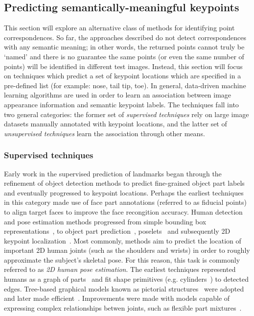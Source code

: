 \subsection{Predicting semantically-meaningful keypoints}

This section will explore an alternative class of methods for identifying point correspondences. So far, the approaches described do not detect correspondences with any semantic meaning; in other words, the returned points cannot truly be `named' and there is no guarantee the same points (or even the same number of points) will be identified in different test images. Instead, this section will focus on techniques which predict a set of keypoint locations which are specified in a pre-defined list (for example: nose, tail tip, toe). In general, data-driven machine learning algorithms are used in order to learn an association between image appearance information and semantic keypoint labels. The techniques fall into two general categories: the former set of \emph{supervised techniques} rely on large image datasets manually annotated with keypoint locations, and the latter set of \emph{unsupervised techniques} learn the association through other means. 

\subsubsection{Supervised techniques}

Early work in the supervised prediction of landmarks began through the refinement of object detection methods to predict fine-grained object part labels and eventually progressed to keypoint locations. Perhaps the earliest techniques in this category made use of face part annotations (referred to as fiducial points) to align target faces to improve the face recongition accuracy. Human detection and pose estimation methods progressed from simple bounding box representations~\cite{hog}, to object part prediction~\cite{xxx,xxx}, poselets~\cite{pose-kposelets} and subsequently 2D keypoint localization~\cite{xxx,xxx}. Most commonly, methods aim to predict the location of important 2D human joints (such as the shoulders and wrists) in order to roughly approximate the subject's skeletal pose. For this reason, this task is commonly referred to as \emph{2D human pose estimation}. The earliest techniques represented humans as a graph of parts~\cite{human-rep-parts} and fit shape primitives (e.g. cylinders~\cite{pose-hogg}) to detected edges. Tree-based graphical models known as pictorial structures~\cite{pictorial-structures} were adopted and later made efficient~\cite{pose-felzen}. Improvements were made with models capable of expressing complex relationships betwen joints, such as flexible part mixtures~\cite{yang2013articulated,pose-johnson-mixtureparts}.

